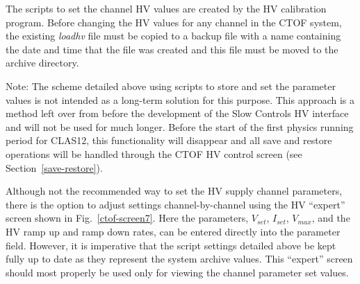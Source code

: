 \documentclass[12pt]{article}
\begin{document}
The scripts to set the channel HV values are created by the HV calibration program. Before 
changing the HV values for any channel in the CTOF system, the existing {\it loadhv} file 
must be copied to a backup file with a name containing the date and time that the file was 
created and this file must be moved to the archive directory.

Note: The scheme detailed above using scripts to store and set the parameter values is not 
intended as a long-term solution for this purpose. This approach is a method left over from 
before the development of the Slow Controls HV interface and will not be used for much longer. 
Before the start of the first physics running period for CLAS12, this functionality will 
disappear and all save and restore operations will be handled through the CTOF HV control screen 
(see Section~\ref{save-restore}).

Although not the recommended way to set the HV supply channel parameters, there is the option 
to adjust settings channel-by-channel using the HV ``expert'' screen shown in 
Fig.~\ref{ctof-screen7}. Here the parameters, $V_{set}$, $I_{set}$, $V_{max}$, and the HV ramp 
up and ramp down rates, can be entered directly into the parameter field. However, it is 
imperative that the script settings detailed above be kept fully up to date as they represent 
the system archive values. This ``expert'' screen should most properly be used only for viewing 
the channel parameter set values.
\end{document}

